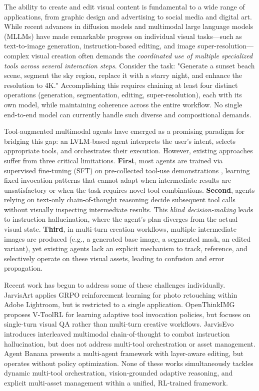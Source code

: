 \documentclass[11pt]{article}
\begin{document}
The ability to create and edit visual content is fundamental to a wide range of applications, from graphic design and advertising to social media and digital art. While recent advances in diffusion models and multimodal large language models (MLLMs) have made remarkable progress on individual visual tasks—such as text-to-image generation, instruction-based editing, and image super-resolution—complex visual creation often demands the \textit{coordinated use of multiple specialized tools across several interaction steps}. Consider the task: "Generate a sunset beach scene, segment the sky region, replace it with a starry night, and enhance the resolution to 4K." Accomplishing this requires chaining at least four distinct operations (generation, segmentation, editing, super-resolution), each with its own model, while maintaining coherence across the entire workflow. No single end-to-end model can currently handle such diverse and compositional demands.

Tool-augmented multimodal agents \cite{shen2023hugginggpt, wu2023visualchatgpt, zhu2024genartist} have emerged as a promising paradigm for bridging this gap: an LVLM-based agent interprets the user's intent, selects appropriate tools, and orchestrates their execution. However, existing approaches suffer from three critical limitations. \textbf{First}, most agents are trained via supervised fine-tuning (SFT) on pre-collected tool-use demonstrations \cite{liu2024llavaplus, qi2024cogcom, wang2024mllmtool}, learning fixed invocation patterns that cannot adapt when intermediate results are unsatisfactory or when the task requires novel tool combinations. \textbf{Second}, agents relying on text-only chain-of-thought reasoning \cite{yao2022react} decide subsequent tool calls without visually inspecting intermediate results. This \textit{blind decision-making} leads to instruction hallucination, where the agent's plan diverges from the actual visual state. \textbf{Third}, in multi-turn creation workflows, multiple intermediate images are produced (e.g., a generated base image, a segmented mask, an edited variant), yet existing agents lack an explicit mechanism to track, reference, and selectively operate on these visual assets, leading to confusion and error propagation.

Recent work has begun to address some of these challenges individually. JarvisArt \cite{lin2025jarvisart} applies GRPO reinforcement learning for photo retouching within Adobe Lightroom, but is restricted to a single application. OpenThinkIMG \cite{su2025openthinkimg} proposes V-ToolRL for learning adaptive tool invocation policies, but focuses on single-turn visual QA rather than multi-turn creative workflows. JarvisEvo \cite{lin2025jarvisevo} introduces interleaved multimodal chain-of-thought to combat instruction hallucination, but does not address multi-tool orchestration or asset management. Agent Banana \cite{ye2026agentbanana} presents a multi-agent framework with layer-aware editing, but operates without policy optimization. None of these works simultaneously tackles dynamic multi-tool orchestration, vision-grounded adaptive reasoning, and explicit multi-asset management within a unified, RL-trained framework.
\end{document}
